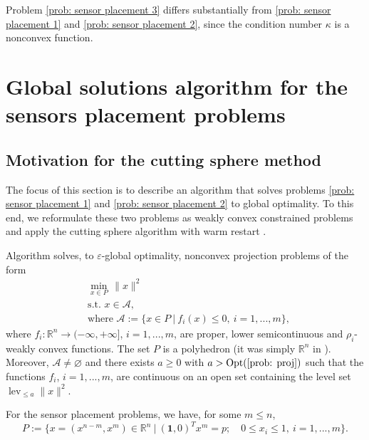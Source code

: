 \documentclass[12pt]{amsart}
\theoremstyle{plain}
\theoremstyle{definition}
\begin{document}
Problem \eqref{prob: sensor placement 3} differs substantially from \eqref{prob: sensor placement 1} and \eqref{prob: sensor placement 2}, since the condition number $\kappa$ is a nonconvex function.

\section{Global solutions algorithm for the sensors placement problems}
\label{sec: reform}

\subsection{Motivation for the cutting sphere method}
\label{chap: reformulation}

The focus of this section is to describe an algorithm that solves problems \eqref{prob: sensor placement 1} and \eqref{prob: sensor placement 2} to global optimality. To this end, we reformulate these two problems as weakly convex constrained problems and apply the cutting sphere algorithm with warm restart \cite[Algorithm 3]{bednarczuk2026outer}.

Algorithm \cite[Algorithm 3]{bednarczuk2026outer} solves,  to $\varepsilon$-global optimality, nonconvex projection problems of the form
\begin{equation}
\label{prob: proj}
\tag{NPP}
\begin{split}
&\operatorname{min}_{x\in P}\, \|x\|^2\\
&\text{s.t. }x\in \mathcal{A},\\
&\text{where }\mathcal{A}:=\{x\in P\ |\ f_i(x)\le 0,\ i=1,...,m\},
\end{split}
\end{equation}
    where $f_i:\mathbb{R}^n\rightarrow (-\infty, +\infty]$, $i=1,...,m$, are proper, lower semicontinuous and $\rho_i$-weakly convex functions. The set $P$ is a polyhedron (it was simply $\mathbb{R}^n$ in \cite[Equation 1]{bednarczuk2026outer}). Moreover, $\mathcal{A}\neq \varnothing$ and there exists $a\ge 0$ with ${a>\operatorname{Opt}(\eqref{prob: proj})}$ such that the functions $f_i$, $i=1,...,m$, are continuous on an open set containing the level set $\operatorname{lev}_{\le a}\|x\|^2$.
 
For the sensor placement problems, we have, for some $m\le n$,    \begin{equation}
\label{eq:poly}
P := \bigl\{ x=(x^{n-m}, x^{m}) \in \mathbb{R}^n \ \big|\ 
(\mathbf{1},0)^T x^{m} = p;\quad 0 \le x_i \le 1,\ i=1,...,m \bigr\}.
\end{equation}
\end{document}
